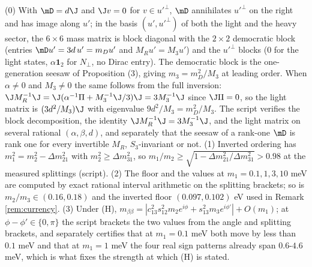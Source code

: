 (0) With $\mD = d\J$ and $\J v = 0$ for $v \in u'^{\perp}$, $\mD$ annihilates $u'^{\perp}$ on the right and has image along $u'$; in the basis $(u', u'^{\perp})$ of both the light and the heavy sector, the $6 \times 6$ mass matrix is block diagonal with the $2 \times 2$ democratic block (entries $\mD u' = 3d\,u' = m_{D}u'$ and $M_{R}u' = M_{3}u'$) and the $u'^{\perp}$ blocks ($0$ for the light states, $\alpha\mathbf{1}_{2}$ for $N_{\perp}$, no Dirac entry). The democratic block is the one-generation seesaw of Proposition (3), giving $m_{3} = m_{D}^{2}/M_{3}$ at leading order. When $\alpha \neq 0$ and $M_{3} \neq 0$ the same follows from the full inversion: $\J M_{R}^{-1}\J = \J(\alpha^{-1}\Pi + M_{3}^{-1}\J/3)\J = 3M_{3}^{-1}\J$ since $\J\Pi = 0$, so the light matrix is $(3d^{2}/M_{3})\J$ with eigenvalue $9d^{2}/M_{3} = m_{D}^{2}/M_{3}$. The script verifies the block decomposition, the identity $\J M_{R}^{-1}\J = 3M_{3}^{-1}\J$, and the light matrix on several rational $(\alpha, \beta, d)$, and separately that the seesaw of a rank-one $\mD$ is rank one for every invertible $M_{R}$, $S_{3}$-invariant or not. (1) Inverted ordering has $m_{1}^{2} = m_{2}^{2} - \Delta m^{2}_{21}$ with $m_{2}^{2} \ge \Delta m^{2}_{31}$, so $m_{1}/m_{2} \ge \sqrt{1 - \Delta m^{2}_{21}/\Delta m^{2}_{31}} > 0.98$ at the measured splittings (script). (2) The floor and the values at $m_{1} = 0.1, 1, 3, 10$ meV are computed by exact rational interval arithmetic on the splitting brackets; so is $m_{2}/m_{3} \in (0.16, 0.18)$ and the inverted floor $(0.097, 0.102)$ eV used in Remark \ref{rem:currency}. (3) Under (H), $m_{\beta\beta} = |c_{13}^{2}s_{12}^{2}m_{2}e^{i\phi} + s_{13}^{2}m_{3}e^{i\phi'}| + O(m_{1})$; at $\phi - \phi' \in \{0, \pi\}$ the script brackets the two values from the angle and splitting brackets, and separately certifies that at $m_{1} = 0.1$ meV both move by less than $0.1$ meV and that at $m_{1} = 1$ meV the four real sign patterns already span $0.6$-$4.6$ meV, which is what fixes the strength at which (H) is stated.
